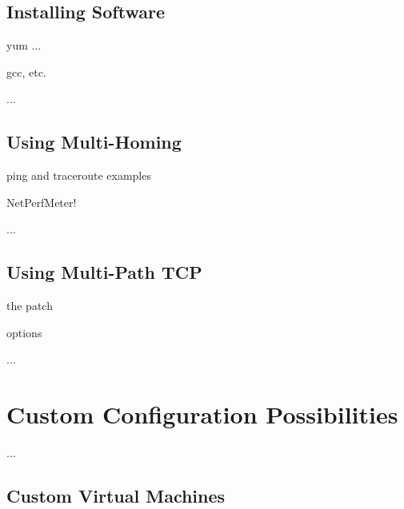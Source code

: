 \section{Installing Software}
\label{sec:Installing-Software}

yum ...

gcc, etc.

...


\section{Using Multi-Homing}
\label{sec:Using-Multi-Homing}

ping and traceroute examples

NetPerfMeter!

...


\section{Using Multi-Path TCP}
\label{sec:Using-Multi-Path-TCP}

the patch

options

...



\chapter{Custom Configuration Possibilities}
\label{cha:Custom-Configuration-Possibilities}

...


\section{Custom Virtual Machines}
\label{sec:Custom-Virtual-Machines}

